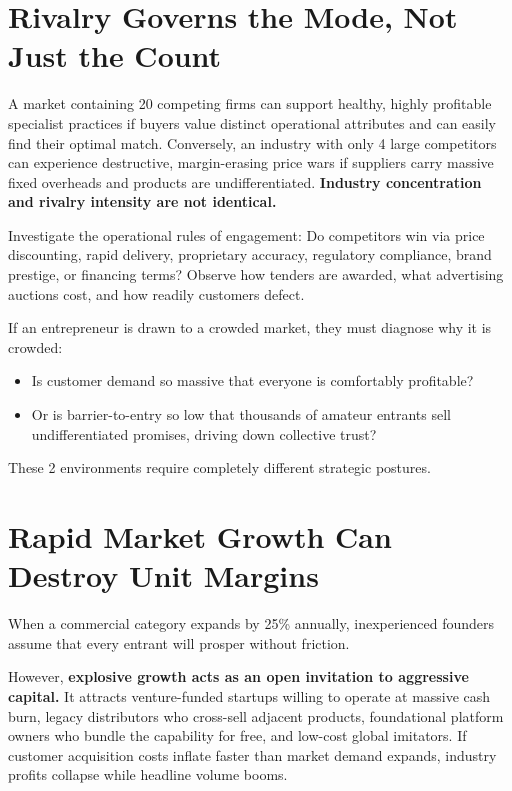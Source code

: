 \section{Rivalry Governs the Mode, Not Just the Count}

A market containing 20 competing firms can support healthy, highly profitable specialist practices if buyers value distinct operational attributes and can easily find their optimal match. Conversely, an industry with only 4 large competitors can experience destructive, margin-erasing price wars if suppliers carry massive fixed overheads and products are undifferentiated. \textbf{Industry concentration and rivalry intensity are not identical.}

Investigate the operational rules of engagement: Do competitors win via price discounting, rapid delivery, proprietary accuracy, regulatory compliance, brand prestige, or financing terms? Observe how tenders are awarded, what advertising auctions cost, and how readily customers defect.

If an entrepreneur is drawn to a crowded market, they must diagnose why it is crowded:
\begin{itemize}[leftmargin=12pt,itemsep=1pt,topsep=1pt]
  \item Is customer demand so massive that everyone is comfortably profitable?
  \item Or is barrier-to-entry so low that thousands of amateur entrants sell undifferentiated promises, driving down collective trust?
\end{itemize}
These 2 environments require completely different strategic postures.

\section{Rapid Market Growth Can Destroy Unit Margins}

When a commercial category expands by 25\% annually, inexperienced founders assume that every entrant will prosper without friction.

However, \textbf{explosive growth acts as an open invitation to aggressive capital.} It attracts venture-funded startups willing to operate at massive cash burn, legacy distributors who cross-sell adjacent products, foundational platform owners who bundle the capability for free, and low-cost global imitators. If customer acquisition costs inflate faster than market demand expands, industry profits collapse while headline volume booms.

